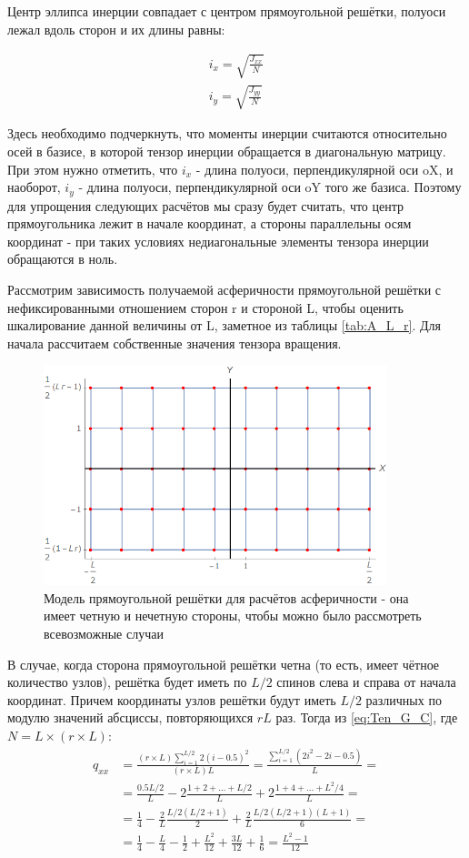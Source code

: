 Центр эллипса инерции совпадает с центром прямоугольной решётки, полуоси лежал вдоль сторон и их длины равны:

\begin{align}
    i_{x} = \sqrt{\frac{J_{xx}}{N}} \label{eq:i_x}\\
    i_{y} = \sqrt{\frac{J_{yy}}{N}}
    \label{eq:i_y}
\end{align}

Здесь необходимо подчеркнуть, что моменты инерции считаются относительно осей в базисе, в которой тензор инерции обращается в диагональную матрицу. При этом нужно отметить, что $i_{x}$ - длина полуоси, перпендикулярной оси oX, и наоборот, $i_{y}$ - длина полуоси, перпендикулярной оси oY того же базиса. Поэтому для упрощения следующих расчётов мы сразу будет считать, что центр прямоугольника лежит в начале координат, а стороны параллельны осям координат - при таких условиях недиагональные элементы тензора инерции обращаются в ноль. 

Рассмотрим зависимость получаемой асферичности прямоугольной решётки с нефиксированными отношением сторон r и стороной L, чтобы оценить шкалирование данной величины от L, заметное из таблицы \ref{tab:A_L_r}. Для начала рассчитаем собственные значения тензора вращения.

\begin{figure}
    \centering
    \includegraphics[width=100mm]{Sections/Images/RectanGrid2.png}
    \caption{Модель прямоугольной решётки для расчётов асферичности - она имеет четную и нечетную стороны, чтобы можно было рассмотреть всевозможные случаи}
    \label{fig:Rectan2}
\end{figure}

В случае, когда сторона прямоугольной решётки четна (то есть, имеет чётное количество узлов), решётка будет иметь по $L/2$ спинов слева и справа от начала координат. Причем координаты узлов решётки будут иметь $L/2$ различных по модулю значений абсциссы, повторяющихся $rL$ раз. Тогда из \eqref{eq:Ten_G_C}, где $N = L \times (r \times L)$:
\begin{align*}
q_{xx} &= \frac{(r\times L) \sum^{L/2}_{i=1}2(i-0.5)^{2}}{(r\times L) L} = \frac{\sum^{L/2}_{i=1}(2i^{2}-2i-0.5)}{L} = \\
&=\frac{0.5 L/2}{L} - 2\frac{1+2+...+L/2}{L} + 2\frac{1 + 4 + ... + L^{2}/4}{L} = \\
&=\frac{1}{4} - \frac{2}{L} \frac{L/2(L/2+1)}{2} + \frac{2}{L} \frac{L/2(L/2+1)(L+1)}{6} = \\
&=\frac{1}{4} - \frac{L}{4} - \frac{1}{2} + \frac{L^{2}}{12} +\frac{3L}{12} + \frac{1}{6} = \frac{L^{2}-1}{12}
\end{align*}


